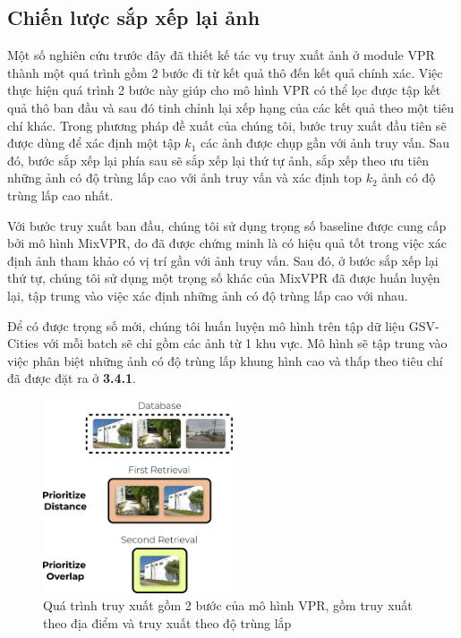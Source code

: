 \subsection{Chiến lược sắp xếp lại ảnh}
Một số nghiên cứu trước đây đã thiết kế tác vụ truy xuất ảnh ở module VPR thành một quá trình gồm 2 bước đi từ kết quả thô đến kết quả chính xác. Việc thực hiện quá trình 2 bước này giúp cho mô hình VPR có thể lọc được tập kết quả thô ban đầu và sau đó tinh chỉnh lại xếp hạng của các kết quả theo một tiêu chí khác. Trong phương pháp đề xuất của chúng tôi, bước truy xuất đầu tiên sẽ được dùng để xác định một tập $k_1$ các ảnh được chụp gần với ảnh truy vấn. Sau đó, bước sắp xếp lại phía sau sẽ sắp xếp lại thứ tự ảnh, sắp xếp theo ưu tiên những ảnh có độ trùng lấp cao với ảnh truy vấn và xác định top $k_2$ ảnh có độ trùng lấp cao nhất.

Với bước truy xuất ban đầu, chúng tôi sử dụng trọng số baseline được cung cấp bởi mô hình MixVPR, do đã được chứng minh là có hiệu quả tốt trong việc xác định ảnh tham khảo có vị trí gần với ảnh truy vấn. Sau đó, ở bước sắp xếp lại thứ tự, chúng tôi sử dụng một trọng số khác của MixVPR đã được huấn luyện lại, tập trung vào việc xác định những ảnh có độ trùng lấp cao với nhau. 

Để có được trọng số mới, chúng tôi huấn luyện mô hình trên tập dữ liệu GSV-Cities \cite{Ali_bey_2022} với mỗi batch sẽ chỉ gồm các ảnh từ 1 khu vực. Mô hình sẽ tập trung vào việc phân biệt những ảnh có độ trùng lấp khung hình cao và thấp theo tiêu chí đã được đặt ra ở \textbf{3.4.1}.

\begin{figure}
  \centering
  \includegraphics[width=0.5\textwidth]{pics/Proposal/rerank.drawio.png}
  \caption[Quá trình truy xuất 2 bước của VPR]{Quá trình truy xuất gồm 2 bước của mô hình VPR, gồm truy xuất theo địa điểm và truy xuất theo độ trùng lắp}
\end{figure}

